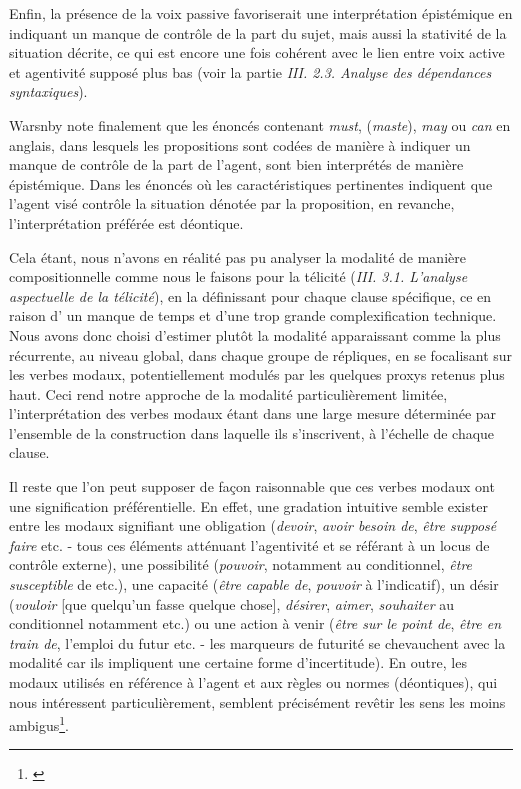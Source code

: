 Enfin, la présence de la voix passive favoriserait une interprétation épistémique en indiquant un manque de contrôle de la part du sujet, mais aussi la stativité de la situation décrite, ce qui est encore une fois cohérent avec le lien entre  voix active et agentivité supposé plus bas (voir la partie \textit{III. 2.3. Analyse des dépendances syntaxiques}). 

 Warsnby note finalement que les énoncés contenant \textit{must}, (\textit{maste}), \textit{may} ou \textit{can} en anglais, dans lesquels les propositions sont codées de manière à indiquer un manque de contrôle de la part de l'agent, sont bien interprétés de manière épistémique. Dans les énoncés où les caractéristiques pertinentes indiquent que l'agent visé contrôle la situation dénotée par la proposition, en revanche, l'interprétation préférée est déontique.

Cela étant, nous n'avons en réalité pas pu analyser la modalité de manière compositionnelle comme nous le faisons pour la télicité (\textit{III. 3.1. L’analyse aspectuelle de la télicité}), en la définissant pour chaque clause spécifique, ce en raison d' un manque de temps et d'une trop grande complexification technique. Nous avons donc choisi d'estimer plutôt la modalité apparaissant comme la plus récurrente, au niveau global, dans chaque groupe de répliques, en se focalisant sur les verbes modaux, potentiellement modulés par les quelques proxys retenus plus haut. Ceci rend notre approche de la modalité particulièrement limitée, l’interprétation des verbes modaux étant dans une large mesure déterminée par l'ensemble de la construction dans laquelle ils s’inscrivent, à l’échelle de chaque clause. 

Il reste que l'on peut supposer de façon raisonnable que ces verbes modaux ont une signification préférentielle. En effet, une gradation intuitive semble exister entre les modaux signifiant une obligation (\textit{devoir}, \textit{avoir besoin de}, \textit{être supposé faire} etc. - tous ces éléments atténuant l'agentivité et se référant à un locus de contrôle externe), une possibilité (\textit{pouvoir}, notamment au conditionnel, \textit{être susceptible} de etc.), une capacité (\textit{être capable de}, \textit{pouvoir} à l'indicatif), un désir (\textit{vouloir} [que quelqu'un fasse quelque chose], \textit{désirer}, \textit{aimer}, \textit{souhaiter} au conditionnel notamment etc.) ou une action à venir (\textit{être sur le point de},\textit{ être en train de}, l'emploi du futur etc. - les marqueurs de futurité se chevauchent avec la modalité car ils impliquent une certaine forme d'incertitude). En outre, les modaux utilisés en référence à l'agent et aux règles ou normes (déontiques), qui nous intéressent particulièrement, semblent précisément revêtir les sens les moins ambigus\footnote{\cite{nesselhauf_mechanisms_2012}}.

